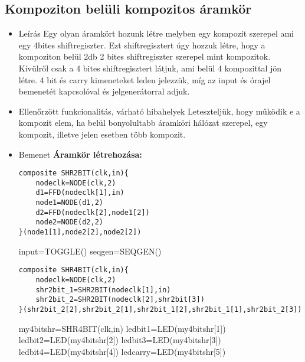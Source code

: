 \subsection{Kompoziton belüli kompozitos áramkör}
\begin{itemize}
\item Leírás\newline
Egy olyan áramkört hozunk létre melyben egy kompozit szerepel ami egy 4bites shiftregiszter. Ezt shiftregisztert úgy hozzuk létre, hogy a kompoziton belül 2db 2 bites shiftregiszter szerepel mint kompozitok. Kívülről csak a 4 bites shiftregisztert látjuk, ami belül 4 kompozittal jön létre. 4 bit és carry kimeneteket leden jelezzük, míg az input és órajel bemenetét kapcsolóval és jelgenerátorral adjuk.
\item Ellenőrzött funkcionalitás, várható hibahelyek\newline
Leteszteljük, hogy működik e a kompozit elem, ha belül bonyolultabb áramköri hálózat szerepel, egy kompozit, illetve jelen esetben több kompozit.
\item Bemenet\newline
\newline
{\bf Áramkör létrehozása:}\newline
\begin{verbatim}
composite SHR2BIT(clk,in){		
    nodeclk=NODE(clk,2)		
    d1=FFD(nodeclk[1],in)		
    node1=NODE(d1,2)			
    d2=FFD(nodeclk[2],node1[2])
    node2=NODE(d2,2)			
}(node1[1],node2[2],node2[2])	
\end{verbatim}

input=TOGGLE() \newline
seqgen=SEQGEN()

\begin{verbatim}
composite SHR4BIT(clk,in){		
    nodeclk=NODE(clk,2)		
    shr2bit_1=SHR2BIT(nodeclk[1],in)
    shr2bit_2=SHR2BIT(nodeclk[2],shr2bit[3])			
}(shr2bit_2[2],shr2bit_2[1],shr2bit_1[2],shr2bit_1[1],shr2bit_2[3])	
\end{verbatim}

my4bitshr=SHR4BIT(clk,in)\newline
ledbit1=LED(my4bitshr[1])\newline
ledbit2=LED(my4bitshr[2])\newline
ledbit3=LED(my4bitshr[3])\newline
ledbit4=LED(my4bitshr[4])\newline
ledcarry=LED(my4bitshr[5])\newline



\end{itemize}
